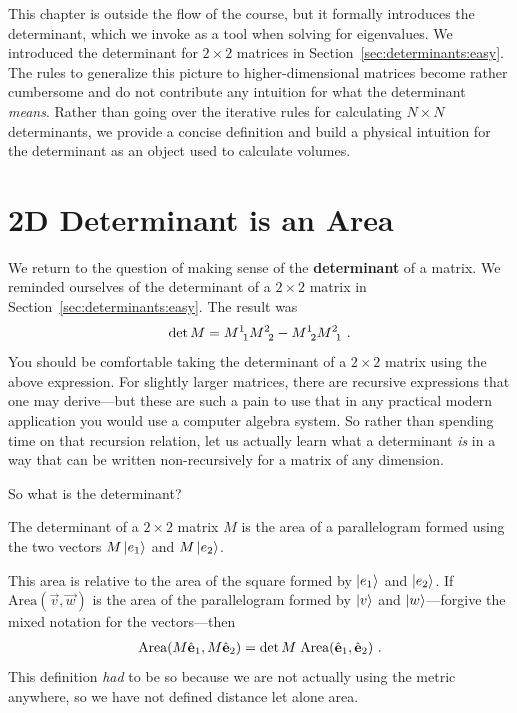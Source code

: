 \documentclass[12pt, oneside]{report}    %
\let\oldsection\section
\def\section{%
  \setcounter{sidenote}{1}%
  \oldsection
}
\begin{document}
This chapter is outside the flow of the course, but it formally introduces the determinant, which we invoke as a tool when solving for eigenvalues. We introduced the determinant for $2\times 2$ matrices in Section~\ref{sec:determinants:easy}. The rules to generalize this picture to higher-dimensional matrices become rather cumbersome and do not contribute any intuition for what the determinant \emph{means}. Rather than going over the iterative rules for calculating $N\times N$ determinants, we provide a concise definition and build a physical intuition for the determinant as an object used to calculate volumes. 


\section{2D Determinant is an Area}
\label{sec:determinants:2D}

We return to the question of making sense of the \textbf{determinant} of a matrix. We reminded ourselves of the determinant of a $2\times 2$ matrix in Section~\ref{sec:determinants:easy}. The result was
\begin{align}
    \det M = M\aij{1}{1}M\aij{2}{2} - M\aij{1}{2} M\aij{2}{1} \ .
    \label{eq:detM:2:expand}
\end{align}
You should be comfortable taking the determinant of a $2\times 2$ matrix using the above expression. For slightly larger matrices, there are recursive expressions that one may derive---but these are such a pain to use that in any practical modern application you would use a computer algebra system. So rather than spending time on that recursion relation, let us actually learn what a determinant \emph{is} in a way that can be written non-recursively for a matrix of any dimension.

So what is the determinant?
\begin{bigidea}\label{idea:det:area}
The determinant of a $2\times 2$ matrix $M$ is the area of a parallelogram formed using the two vectors $M\left|e_1\right\rangle$ and $M\left|e_2\right\rangle$. 
\end{bigidea}
This area is relative to the area of the square formed by $\left|e_1\right\rangle$ and $\left|e_2\right\rangle$. If $\text{Area}(\vec{v}, \vec{w})$ is the area of the parallelogram formed by $\left|v\right\rangle$ and $\left|w\right\rangle$---forgive the mixed notation for the vectors---then
\begin{align}
    \textnormal{Area}(M\hat{\mathbf{e}}_1, M\hat{\mathbf{e}}_2) = 
    \det M \; \textnormal{Area}(\hat{\mathbf{e}}_1, \hat{\mathbf{e}}_2) 
    \ .
\end{align}
This definition \emph{had} to be so because we are not actually using the metric anywhere, so we have not defined distance let alone area. 
\end{document}

